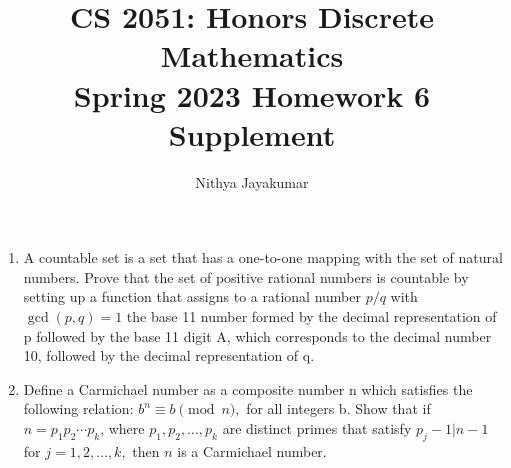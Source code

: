 \documentclass{article}
\title{\vspace{-1cm}CS 2051: Honors Discrete Mathematics \\Spring 2023 Homework 6 Supplement}
\author{Nithya Jayakumar }
\date{}
\begin{document}
\maketitle
\begin{enumerate}
    \item A countable set is a set that has a one-to-one mapping with the set of natural numbers. Prove that the set of positive rational numbers is countable by setting up a function that assigns to a rational number $p/q$ with $\gcd (p, q) = 1$ the base 11 number formed by the decimal representation of p followed by the base 11 digit A, which corresponds to the decimal number 10, followed by the decimal representation of q. 

    \item Define a Carmichael number as a composite number n which satisfies the following relation: $b^n \equiv b \pmod{n},$ for all integers b.
    Show that if $n = p_1p_2 \cdots p_k$, where $p_1, p_2, \dots, p_k$ are distinct primes that satisfy $p_j - 1 \vert n - 1$ for $j = 1, 2, \dots, k,$ then $n$ is a Carmichael number.
\end{enumerate}
\end{document}
